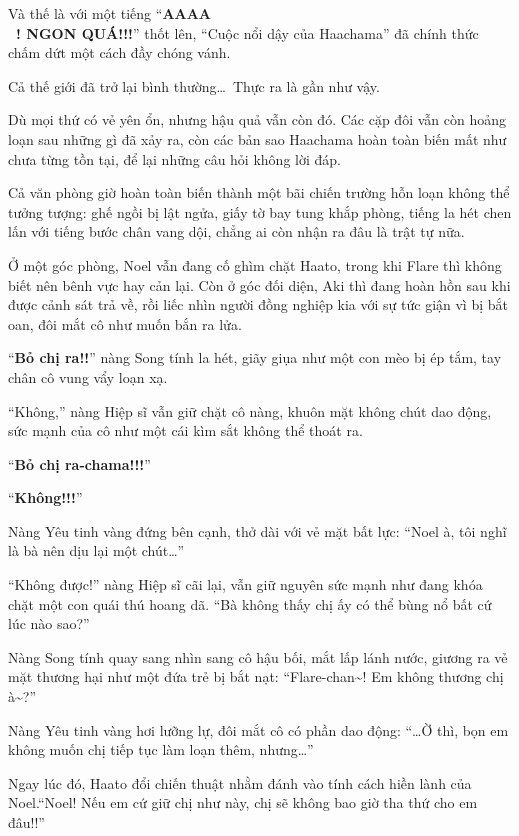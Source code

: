 \documentclass[../main.tex]{subfiles}
\begin{document}
Và thế là với một tiếng ``\textbf{AAAA\\~{}! NGON QUÁ!!!}'' thốt lên, ``Cuộc nổi dậy của Haachama'' đã chính thức chấm dứt một cách đầy chóng vánh.

Cả thế giới đã trở lại bình thường\dots\ Thực ra là gần như vậy.

Dù mọi thứ có vẻ yên ổn, nhưng hậu quả vẫn còn đó. Các cặp đôi vẫn còn hoảng loạn sau những gì đã xảy ra, còn các bản sao Haachama hoàn toàn biến mất như chưa từng tồn tại, để lại những câu hỏi không lời đáp.

Cả văn phòng giờ hoàn toàn biến thành một bãi chiến trường hỗn loạn không thể tưởng tượng: ghế ngồi bị lật ngửa, giấy tờ bay tung khắp phòng, tiếng la hét chen lấn với tiếng bước chân vang dội, chẳng ai còn nhận ra đâu là trật tự nữa.

Ở một góc phòng, Noel vẫn đang cố ghìm chặt Haato, trong khi Flare thì không biết nên bênh vực hay cản lại. Còn ở góc đối diện, Aki thì đang hoàn hồn sau khi được cảnh sát trả về, rồi liếc nhìn người đồng nghiệp kia với sự tức giận vì bị bắt oan, đôi mắt cô như muốn bắn ra lửa.


``\textbf{Bỏ chị ra!!}'' nàng Song tính la hét, giãy giụa như một con mèo bị ép tắm, tay chân cô vung vẩy loạn xạ.

``Không,'' nàng Hiệp sĩ vẫn giữ chặt cô nàng, khuôn mặt không chút dao động, sức mạnh của cô như một cái kìm sắt không thể thoát ra.

``\textbf{Bỏ chị ra-chama!!!}''

``\textbf{Không!!!}''

Nàng Yêu tinh vàng đứng bên cạnh, thở dài với vẻ mặt bất lực: ``Noel à, tôi nghĩ là bà nên dịu lại một chút\dots''

``Không được!'' nàng Hiệp sĩ cãi lại, vẫn giữ nguyên sức mạnh như đang khóa chặt một con quái thú hoang dã. ``Bà không thấy chị ấy có thể bùng nổ bất cứ lúc nào sao?''

Nàng Song tính quay sang nhìn sang cô hậu bối, mắt lấp lánh nước, giương ra vẻ mặt thương hại như một đứa trẻ bị bắt nạt: ``Flare-chan\~{}! Em không thương chị à\~{}?''

Nàng Yêu tinh vàng hơi lưỡng lự, đôi mắt cô có phần dao động: ``\dots Ờ thì, bọn em không muốn chị tiếp tục làm loạn thêm, nhưng\dots''

Ngay lúc đó, Haato đổi chiến thuật nhằm đánh vào tính cách hiền lành của Noel.``Noel! Nếu em cứ giữ chị như này, chị sẽ không bao giờ tha thứ cho em đâu!!''
\end{document}

